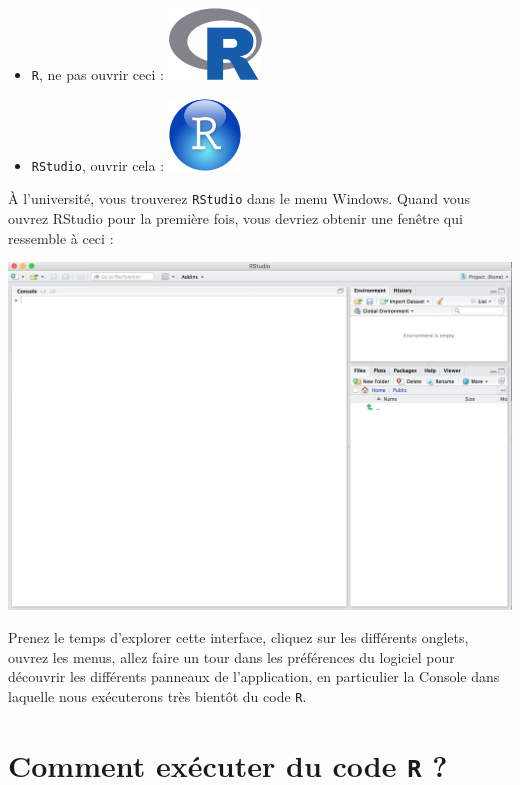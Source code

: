 \documentclass[
  letterpaper,
  DIV=11,
  numbers=noendperiod]{scrreprt}
\providecommand{\tightlist}{%
  \setlength{\itemsep}{0pt}\setlength{\parskip}{0pt}}\usepackage{longtable,booktabs,array}
\begin{document}
\begin{itemize}
\tightlist
\item
  \texttt{R}, ne pas ouvrir ceci : \includegraphics{./images/Rlogo.png}
\item
  \texttt{RStudio}, ouvrir cela :
  \includegraphics{./images/RStudio-Ball.png}
\end{itemize}

À l'université, vous trouverez \texttt{RStudio} dans le menu Windows.
Quand vous ouvrez RStudio pour la première fois, vous devriez obtenir
une fenêtre qui ressemble à ceci :

\includegraphics{./images/rstudio.png}

Prenez le temps d'explorer cette interface, cliquez sur les différents
onglets, ouvrez les menus, allez faire un tour dans les préférences du
logiciel pour découvrir les différents panneaux de l'application, en
particulier la Console dans laquelle nous exécuterons très bientôt du
code \texttt{R}.

\hypertarget{sec-code}{%
\section{\texorpdfstring{Comment exécuter du code \texttt{R}
?}{Comment exécuter du code R ?}}\label{sec-code}}
\end{document}
